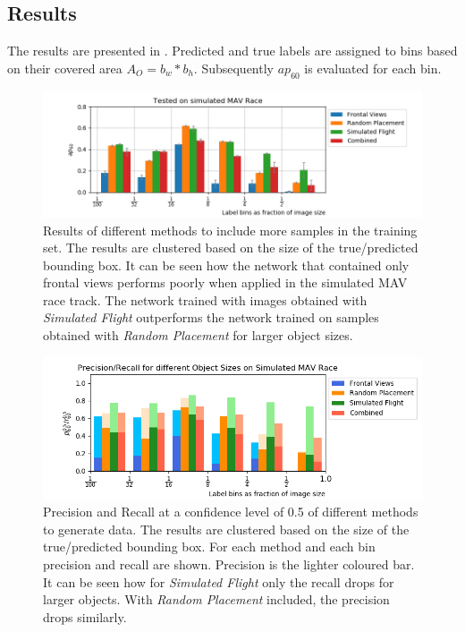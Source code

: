 \subsection{Results}

The results are presented in . Predicted and true labels are assigned to bins based on their covered area $A_O=b_w*b_h$. Subsequently $ap_{60}$ is evaluated for each bin. 
\begin{figure}[hbtp]
	\includegraphics[width=\textwidth]{fig/view_size}
	\caption{Results of different methods to include more samples in the training set. The results are clustered based on the size of the true/predicted bounding box. It can be seen how the network that contained only frontal views performs poorly when applied in the simulated \ac{MAV} race track. The network trained with images obtained with \textit{Simulated Flight} outperforms the network trained on samples obtained with \textit{Random Placement} for larger object sizes.}
	\label{fig:view_size}
\end{figure}

\begin{figure}[hbtp]
	\includegraphics[width=\textwidth]{fig/view_precision_recall}
	\caption{Precision and Recall at a confidence level of 0.5 of different methods to generate data. The results are clustered based on the size of the true/predicted bounding box. For each method and each bin precision and recall are shown. Precision is the lighter coloured bar. It can be seen how for \textit{Simulated Flight} only the recall drops for larger objects. With \textit{Random Placement} included, the precision drops similarly.}
	\label{fig:view_size_pr}
\end{figure}

